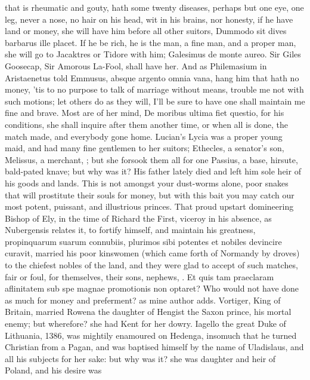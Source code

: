 that is rheumatic and gouty, hath some twenty diseases, perhaps but one
eye, one leg, never a nose, no hair on his head, wit in his brains, nor
honesty, if he have land or money, she will have him before all
other suitors, Dummodo sit dives barbarus ille placet. If he be
rich, he is the man, a fine man, and a proper man, she will go to
Jacaktres or Tidore with him; Galesimus de monte aureo. Sir Giles
Goosecap, Sir Amorous La-Fool, shall have her. And as Philemasium in
 Aristaenetus told Emmusus, absque argento omnia vana, hang him
that hath no money, 'tis to no purpose to talk of marriage without
means,  trouble me not with such motions; let others do as they
will, I'll be sure to have one shall maintain me fine and brave. Most
are of her mind,  De moribus ultima fiet questio, for his
conditions, she shall inquire after them another time, or when all is
done, the match made, and everybody gone home. Lucian's Lycia was
a proper young maid, and had many fine gentlemen to her suitors;
Ethecles, a senator's son, Melissus, a merchant, \etc{}; but she forsook
them all for one Passius, a base, hirsute, bald-pated knave; but why
was it? His father lately died and left him sole heir of his goods and
lands. This is not amongst your dust-worms alone, poor snakes that will
prostitute their souls for money, but with this bait you may catch our
most potent, puissant, and illustrious princes. That proud upstart
domineering Bishop of Ely, in the time of Richard the First, viceroy in
his absence, as Nubergensis relates it, to fortify himself, and
maintain his greatness, propinquarum suarum connubiis, plurimos sibi
potentes et nobiles devincire curavit, married his poor kinswomen
(which came forth of Normandy by droves) to the chiefest nobles of the
land, and they were glad to accept of such matches, fair or foul, for
themselves, their sons, nephews, \etc{}. Et quis tam praeclaram aflinitatem
sub spe magnae promotionis non optaret? Who would not have done as much
for money and preferment? as mine author adds. Vortiger, King of
Britain, married Rowena the daughter of Hengist the Saxon prince, his
mortal enemy; but wherefore? she had Kent for her dowry. Iagello the
great Duke of Lithuania, 1386, was mightily enamoured on Hedenga,
insomuch that he turned Christian from a Pagan, and was baptised
himself by the name of Uladislaus, and all his subjects for her sake:
but why was it? she was daughter and heir of Poland, and his desire was
